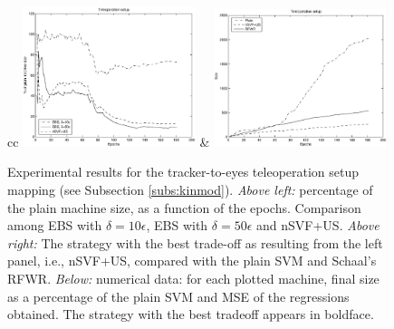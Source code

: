 \documentclass[conference]{IEEEtran}
\begin{document}
\begin{figure}[!htbp]
  \begin{center}
    \begin{tabular}{cc}
       \includegraphics[width=0.45\textwidth]{fig3b} &
       \includegraphics[width=0.45\textwidth]{fig4b} \\[5mm]
    \end{tabular}
  \end{center}
  \caption{\label{fig:teleop} Experimental results for the
    tracker-to-eyes teleoperation setup mapping (see Subsection
    \ref{subs:kinmod}). \emph{Above left:} percentage of the plain
    machine size, as a function of the epochs. Comparison among EBS
    with $\delta=10\epsilon$, EBS with $\delta=50\epsilon$ and
    nSVF+US. \emph{Above right:} The strategy with the best trade-off
    as resulting from the left panel, i.e., nSVF+US, compared with the
    plain SVM and Schaal's RFWR. \emph{Below:} numerical data: for
    each plotted machine, final size as a percentage of the plain SVM
    and MSE of the regressions obtained. The strategy with the best
    tradeoff appears in boldface.}
\end{figure}
\end{document}
